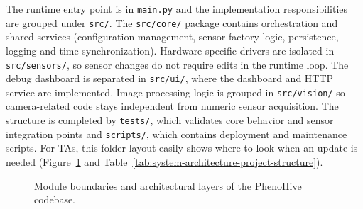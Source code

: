 The runtime entry point is in \texttt{main.py} and the implementation responsibilities are grouped under \texttt{src/}. The \texttt{src/core/} package contains orchestration and shared services (configuration management, sensor factory logic, persistence, logging and time synchronization). Hardware-specific drivers are isolated in \texttt{src/sensors/}, so sensor changes do not require edits in the runtime loop. The debug dashboard is separated in \texttt{src/ui/}, where the dashboard and HTTP service are implemented. Image-processing logic is grouped in \texttt{src/vision/} so camera-related code stays independent from numeric sensor acquisition. The structure is completed by \texttt{tests/}, which validates core behavior and sensor integration points and \texttt{scripts/}, which contains deployment and maintenance scripts. For TAs, this folder layout easily shows where to look when an update is needed (Figure~\ref{fig:module-boundaries} and Table~\ref{tab:system-architecture-project-structure}).

\begin{figure}[H]
\centering
{}
\caption[PhenoHive Module Boundaries]{Module boundaries and architectural layers of the PhenoHive codebase.}
\label{fig:module-boundaries}
\end{figure}

